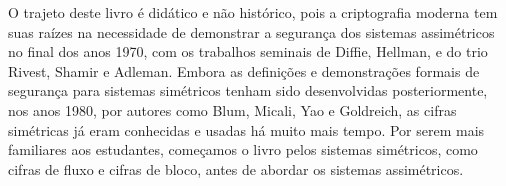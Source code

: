 O trajeto deste livro é didático e não histórico, pois a criptografia moderna tem suas raízes na necessidade de demonstrar a segurança dos sistemas assimétricos no final dos anos 1970, com os trabalhos seminais de Diffie, Hellman, e do trio Rivest, Shamir e Adleman.
Embora as definições e demonstrações formais de segurança para sistemas simétricos tenham sido desenvolvidas posteriormente, nos anos 1980, por autores como Blum, Micali, Yao e Goldreich, as cifras simétricas já eram conhecidas e usadas há muito mais tempo.
Por serem mais familiares aos estudantes, começamos o livro pelos sistemas simétricos, como cifras de fluxo e cifras de bloco, antes de abordar os sistemas assimétricos.




